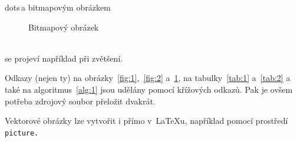 \documentclass[a4paper, 11pt]{article}
\begin{document}
dots\,a bitmapovým obrázkem
\begin{figure}[h]
    \centering
    \caption{Bitmapový obrázek}
    \label{fig:3}
\end{figure}
\bigskip
\\se projeví například při zvětšení.

Odkazy (nejen ty) na obrázky~\ref{fig:1},~\ref{fig:2} a~\ref{fig:3}, na tabulky~\ref{tab:1} a~\ref{tab:2} a také na algoritmus~\ref{alg:1} jsou udělány pomocí křížových odkazů. Pak je ovšem potřeba zdrojový soubor přeložit dvakrát.

Vektorové obrázky lze vytvořit i přímo v~\LaTeX u, například pomocí prostředí\texttt{ picture.}
\end{document}

